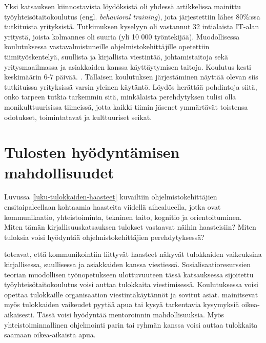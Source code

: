 \documentclass[utf8]{gradu3}
\begin{document}
Yksi katsauksen kiinnostavista löydöksistä oli yhdessä artikkelissa \parencite{kulkarni-ym-2010} mainittu työyhteisötaitokoulutus (engl. \textit{behavioral training}), jota järjestettiin lähes 80\%:ssa tutkituista yrityksistä. Tutkimuksen kyselyyn oli vastannut 32 intialaista IT-alan yritystä, joista kolmannes oli suuria (yli 10 000 työntekijää). Muodollisessa koulutuksessa vastavalmistuneille ohjelmistokehittäjille opetettiin tiimityöskentelyä, suullista ja kirjallista viestintää, johtamistaitoja sekä yritysmaailmassa ja asiakkaiden kanssa käyttäytymisen taitoja. Koulutus kesti keskimäärin 6-7 päivää. \parencite{kulkarni-ym-2010}. Tällaisen koulutuksen järjestäminen näyttää olevan siis tutkituissa yrityksissä varsin yleinen käytäntö. Löydös herättää pohdintoja siitä, onko tarpeen tutkia tarkemmin sitä, minkälaista perehdytyksen tulisi olla monikulttuurisissa tiimeissä, jotta kaikki tiimin jäsenet ymmärtävät toistensa odotukset, toimintatavat ja kulttuuriset seikat. 

\section{Tulosten hyödyntämisen mahdollisuudet}

Luvussa \ref{luku-tulokkaiden-haasteet} kuvailtiin ohjelmistokehittäjien ensitaipaleellaan kohtaamia haasteita viidellä aihealueella, jotka ovat kommunikaatio, yhteistoiminta, tekninen taito, kognitio ja orientoituminen. Miten tämän kirjallisuuskatsauksen tulokset vastaavat näihin haasteisiin? Miten tuloksia voisi hyödyntää ohjelmistokehittäjien perehdytyksessä?

\textcite{begel-simon-2008} toteavat, että kommunikointiin liittyvät haasteet näkyvät tulokkaiden vaikeuksina kirjallisessa, suullisessa ja asiakkaiden kanssa viestiessä. Sosialisaatioresurssien teorian muodollisen työnopetukseen ulottuvuuteen tässä katsauksessa sijoitettu työyhteisötaitokoulutus voisi auttaa tulokkaita viestimisessä. Koulutuksessa voisi opettaa tulokkaille organisaation viestintäkäytännöt ja sovitut asiat. \textcite{begel-simon-2008} mainitsevat myös tulokkaiden vaikeudet pyytää apua tai kysyä tarkentavia kysymyksiä oikea-aikaisesti. Tässä voisi hyödyntää mentoroinnin mahdollisuuksia. Myös yhteistoiminnallinen ohjelmointi parin tai ryhmän kanssa voisi auttaa tulokkaita saamaan oikea-aikaista apua.
\end{document}
